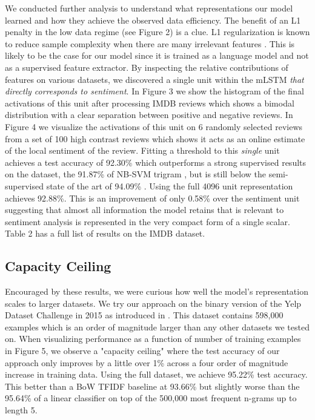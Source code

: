 We conducted further analysis to understand what representations our model learned and how they achieve the observed data efficiency. The benefit of an L1 penalty in the low data regime (see Figure 2) is a clue. L1 regularization is known to reduce sample complexity when there are many irrelevant features \cite{ng2004feature}. This is likely to be the case for our model since it is trained as a language model and not as a supervised feature extractor. By inspecting the relative contributions of features on various datasets, we discovered a single unit within the mLSTM \textit{that directly corresponds to sentiment}. In Figure 3 we show the histogram of the final activations of this unit after processing IMDB reviews \cite{maas2011learning} which shows a bimodal distribution with a clear separation between positive and negative reviews. In Figure 4 we visualize the activations of this unit on 6 randomly selected reviews from a set of 100 high contrast reviews which shows it acts as an online estimate of the local sentiment of the review. Fitting a threshold to this \textit{single} unit achieves a test accuracy of 92.30\% which outperforms a strong supervised results on the dataset, the 91.87\% of NB-SVM trigram \cite{mesnil2014ensemble}, but is still below the semi-supervised state of the art of 94.09\% \cite{miyato2016adversarial}. Using the full 4096 unit representation achieves 92.88\%. This is an improvement of only 0.58\% over the sentiment unit suggesting that almost all information the model retains that is relevant to sentiment analysis is represented in the very compact form of a single scalar. Table 2 has a full list of results on the IMDB dataset.

\subsection{Capacity Ceiling}

Encouraged by these results, we were curious how well the model's representation scales to larger datasets. We try our approach on the binary version of the Yelp Dataset Challenge in 2015 as introduced in \citet{zhang2015character}. This dataset contains 598,000 examples which is an order of magnitude larger than any other datasets we tested on. When visualizing performance as a function of number of training examples in Figure 5, we observe a "capacity ceiling" where the test accuracy of our approach only improves by a little over 1\% across a four order of magnitude increase in training data. Using the full dataset, we achieve 95.22\% test accuracy. This better than a BoW TFIDF baseline at 93.66\% but slightly worse than the 95.64\% of a linear classifier on top of the 500,000 most frequent n-grams up to length 5.

